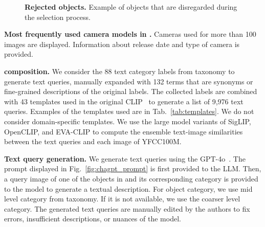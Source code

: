 \begin{figure}[t]
    \centering
    
    \vspace{-7pt}
    \caption{\textbf{Rejected objects.} Example of objects that are disregarded during the selection process.
    \label{fig:rejected}
    }
\end{figure}

\begin{table}[t]
  \centering
  \scalebox{0.99}{
    
  }
  \vspace{-7pt}
  \caption{\textbf{Most frequently used camera models in \ours.} Cameras used for more than 100 images are displayed. Information about release date and type of camera is provided.
  \label{tab:cameras}
  \vspace{-12pt}
  }
\end{table}

\noindent\textbf{\miniours composition.} We consider the 88 text category labels from \ours taxonomy to generate text queries, manually expanded with 132 terms that are synonyms or fine-grained descriptions of the original labels. The collected labels are combined with 43 templates used in the original CLIP~\cite{clip} to generate a list of 9,976 text queries. Examples of the templates used are in Tab.~\ref{tab:templates}. We do not consider domain-specific templates. We use the large model variants of SigLIP, OpenCLIP, and EVA-CLIP to compute the ensemble text-image similarities between the text queries and each image of YFCC100M.

\noindent\textbf{Text query generation.} 
We generate text queries using the GPT-4o~\cite{chatgpt}. The prompt displayed in Fig.~\ref{fig:chagpt_prompt} is first provided to the LLM. 
Then, a query image of one of the objects in \ours and its corresponding category is provided to the model to generate a textual description. For object category, we use mid level category from taxonomy. If it is not available, we use the coarser level category. The generated text queries are manually edited by the authors to fix errors, insufficient descriptions, or nuances of the model.

